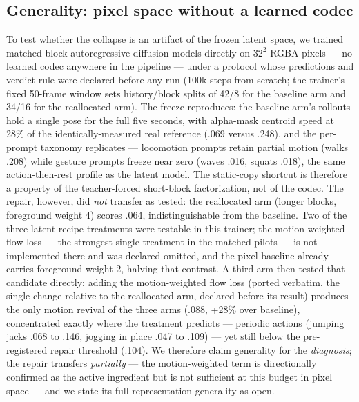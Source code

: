 \documentclass[10pt,twocolumn]{article}
\begin{document}
\subsection{Generality: pixel space without a learned codec}
To test whether the collapse is an artifact of the frozen latent space, we trained matched block-autoregressive
diffusion models directly on $32^2$ RGBA pixels — no learned codec anywhere in the pipeline — under a protocol whose
predictions and verdict rule were declared before any run (100k steps from scratch; the trainer's fixed 50-frame
window sets history/block splits of 42/8 for the baseline arm and 34/16 for the reallocated arm). The freeze
reproduces: the baseline arm's rollouts hold a single pose for the full five seconds, with alpha-mask centroid speed
at 28\% of the identically-measured real reference (.069 versus .248), and the per-prompt taxonomy replicates —
locomotion prompts retain partial motion (walks .208) while gesture prompts freeze near zero (waves .016, squats
.018), the same action-then-rest profile as the latent model. The static-copy shortcut is therefore a property of the
teacher-forced short-block factorization, not of the codec. The repair, however, did \emph{not} transfer as tested:
the reallocated arm (longer blocks, foreground weight 4) scores .064, indistinguishable from the baseline. Two of
the three latent-recipe treatments were testable in this trainer; the motion-weighted flow loss — the strongest
single treatment in the matched pilots — is not implemented there and was declared omitted, and the pixel baseline
already carries foreground weight 2, halving that contrast. A third arm then tested that candidate directly: adding the
motion-weighted flow loss (ported verbatim, the single change relative to the reallocated arm, declared before its
result) produces the only motion revival of the three arms (.088, +28\% over baseline), concentrated exactly where
the treatment predicts — periodic actions (jumping jacks .068 to .146, jogging in place .047 to .109) — yet still
below the pre-registered repair threshold (.104). We therefore claim generality for the \emph{diagnosis}; the
repair transfers \emph{partially} — the motion-weighted term is directionally confirmed as the active ingredient but
is not sufficient at this budget in pixel space — and we state its full representation-generality as open.
\end{document}
